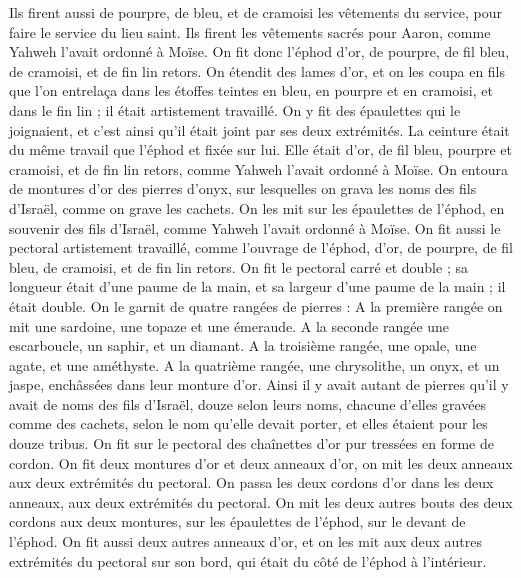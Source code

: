 \begin{multicols}{2}
\VerseOne{}Ils firent aussi de pourpre, de bleu, et de cramoisi les vêtements du service, pour faire le service du lieu saint. Ils firent les vêtements sacrés pour Aaron, comme Yahweh l'avait ordonné à Moïse.
On fit donc l'éphod d'or, de pourpre, de fil bleu, de cramoisi, et de fin lin retors.
On étendit des lames d'or, et on les coupa en fils que l’on entrelaça dans les étoffes teintes en bleu, en pourpre et en cramoisi, et dans le fin lin ; il était artistement travaillé.
On y fit des épaulettes qui le joignaient, et c’est ainsi qu’il était joint par ses deux extrémités.
La ceinture était du même travail que l’éphod et fixée sur lui. Elle était d’or, de fil bleu, pourpre et cramoisi, et de fin lin retors, comme Yahweh l'avait ordonné à Moïse.
On entoura de montures d’or des pierres d’onyx, sur lesquelles on grava les noms des fils d’Israël, comme on grave les cachets.
On les mit sur les épaulettes de l'éphod, en souvenir des fils d'Israël, comme Yahweh l’avait ordonné à Moïse.
On fit aussi le pectoral artistement travaillé, comme l'ouvrage de l'éphod, d'or, de pourpre, de fil bleu, de cramoisi, et de fin lin retors.
On fit le pectoral carré et double ; sa longueur était d'une paume de la main, et sa largeur d'une paume de la main ; il était double.
On le garnit de quatre rangées de pierres : A la première rangée on mit une sardoine, une topaze et une émeraude.
A la seconde rangée une escarboucle, un saphir, et un diamant.
A la troisième rangée, une opale, une agate, et une améthyste.
A la quatrième rangée, une chrysolithe, un onyx, et un jaspe, enchâssées dans leur monture d’or.
Ainsi il y avait autant de pierres qu'il y avait de noms des fils d'Israël, douze selon leurs noms, chacune d'elles gravées comme des cachets, selon le nom qu'elle devait porter, et elles étaient pour les douze tribus.
On fit sur le pectoral des chaînettes d’or pur tressées en forme de cordon.
On fit deux montures d'or et deux anneaux d'or, on mit les deux anneaux aux deux extrémités du pectoral.
On passa les deux cordons d'or dans les deux anneaux, aux deux extrémités du pectoral.
On mit les deux autres bouts des deux cordons aux deux montures, sur les épaulettes de l'éphod, sur le devant de l'éphod.
On fit aussi deux autres anneaux d'or, et on les mit aux deux autres extrémités du pectoral sur son bord, qui était du côté de l'éphod à l’intérieur.

\end{multicols}
